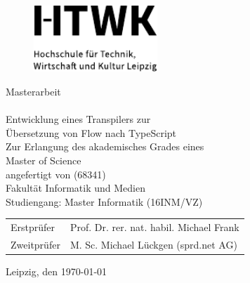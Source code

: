 \makeatletter
\begin{titlepage}
  \vspace{1cm}

  \begin{figure}[h!]
    \centering
    \includegraphics[height=2.5cm]{src/0_Frontmatter/htwk.pdf}
  \end{figure}

  \begin{center}
    \vspace{1cm}

    \begin{onehalfspacing}
      {\Large Masterarbeit} \\[8ex]
      {\huge\textbf{\@title}} \\[5ex]
      {\LARGE\libertineSB Entwicklung eines Transpilers zur\\[.5ex]Übersetzung von Flow nach TypeScript} \\[8ex]
      \large
      Zur Erlangung des akademisches Grades eines \\
      Master of Science \\[5ex]
      \vfill
      {\libertineSB angefertigt von \@author{ }(68341)}\\[5ex]
      \vfill
      Fakultät Informatik und Medien\\
      Studiengang: Master Informatik (16INM/VZ)\\[5ex]
      \vfill
      \begin{tabular}{ll}
        Erstprüfer & Prof. Dr. rer. nat. habil. Michael Frank \\
        Zweitprüfer & M. Sc. Michael Lückgen (sprd.net AG) \\
      \end{tabular}
      \vspace{5ex}
      \vfill
      Leipzig, den \today %
    \end{onehalfspacing}
  \end{center}
\end{titlepage}
\makeatother
